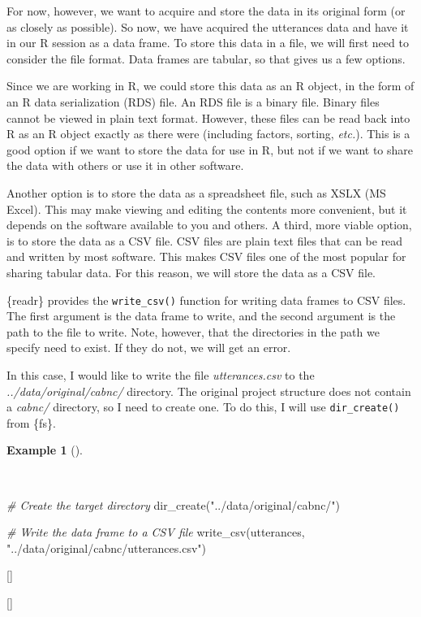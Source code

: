 \documentclass[
  letterpaper,
  krantz1]{latex/krantz-mod}
\newenvironment{Shaded}{\begin{snugshade}}{\end{snugshade}}
\newcommand{\CommentTok}[1]{\textcolor[rgb]{0.00,0.00,0.00}{\textit{#1}}}
\newcommand{\FunctionTok}[1]{\textcolor[rgb]{0.00,0.00,0.00}{#1}}
\newcommand{\NormalTok}[1]{\textcolor[rgb]{0.00,0.00,0.00}{#1}}
\newcommand{\StringTok}[1]{\textcolor[rgb]{0.00,0.00,0.00}{#1}}
\newcommand{\cindex}[1]{%
  \StrSubstitute{#1}{_}{\_}[\temp]%
  \index{\temp}%
}
\theoremstyle{definition}
\theoremstyle{definition}
\newtheorem{example}{Example}[chapter]
\theoremstyle{remark}
\begin{document}
For now, however, we want to acquire and store the data in its original
form (or as closely as possible). So now, we have acquired the
utterances data and have it in our R session as a data
frame. To store this data in a file, we will first
need to consider the file format. Data frames are tabular, so that gives
us a few options.

Since we are working in R, we could store this data as an R object, in
the form of an R data serialization (RDS)
file. An RDS file is a binary
file. Binary files cannot be viewed in plain text format. However, these
files can be read back into R as an R object exactly as there were
(including factors, sorting, \emph{etc.}). This is a good option if we
want to store the data for use in R, but not if we want to share the
data with others or use it in other software.

Another option is to store the data as a spreadsheet file, such as XSLX
(MS Excel). This may make viewing and editing
the contents more convenient, but it depends on the software available
to you and others. A third, more viable option, is to store the data as
a CSV file. CSV files are plain
text files that can be read and written by most software. This makes CSV
files one of the most popular for sharing tabular data. For this reason,
we will store the data as a CSV file.

\{readr\} provides the \texttt{write\_csv()} function for writing data
frames to CSV files. The first argument is the data frame to write, and
the second argument is the path to the file to write. Note, however,
that the directories in the path we specify need to exist. If they do
not, we will get an error.

In this case, I would like to write the file \emph{utterances.csv} to
the \emph{../data/original/cabnc/} directory. The original project
structure does not contain a \emph{cabnc/} directory, so I need to
create one. To do this, I will use \texttt{dir\_create()} from
\{fs\}.

\begin{example}[]\protect\hypertarget{exm-acquire-write-csv}{}\label{exm-acquire-write-csv}

~

\begin{Shaded}
\begin{Highlighting}[numbers=left,,]
\CommentTok{\# Create the target directory}
\FunctionTok{dir\_create}\NormalTok{(}\StringTok{"../data/original/cabnc/"}\NormalTok{)}

\CommentTok{\# Write the data frame to a CSV file}
\FunctionTok{write\_csv}\NormalTok{(utterances, }\StringTok{"../data/original/cabnc/utterances.csv"}\NormalTok{)}
\end{Highlighting}
\end{Shaded}

\cindex{dir_create()}
\cindex{write_csv()}

\end{example}
\end{document}
